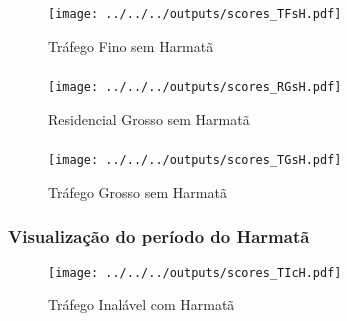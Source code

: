 \begin{frame}
  \frametitle{}
  \begin{figure}[H]
   \centering
    \caption{Tráfego Fino sem Harmatã}
    \texttt{[image: ../../../outputs/scores\_TFsH.pdf]}
  \end{figure}
\end{frame}


\begin{frame}
  \frametitle{}
    
\end{frame}

\begin{frame}
  \frametitle{}
  \begin{figure}[H]
   \centering
    \caption{Residencial Grosso sem Harmatã}
    \texttt{[image: ../../../outputs/scores\_RGsH.pdf]}
  \end{figure}
\end{frame}

\begin{frame}
  \frametitle{}
    
\end{frame}

\begin{frame}
  \frametitle{}
  \begin{figure}[H]
   \centering
    \caption{Tráfego Grosso sem Harmatã}
    \texttt{[image: ../../../outputs/scores\_TGsH.pdf]}
  \end{figure}
\end{frame}

\begin{frame}
  \frametitle{Visualização do período do Harmatã}
  \begin{figure}[H]
   \centering
    \caption{Tráfego Inalável com Harmatã}
    \texttt{[image: ../../../outputs/scores\_TIcH.pdf]}
  \end{figure}
\end{frame}
